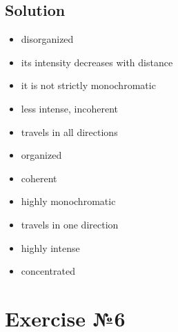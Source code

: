 \subsection*{Solution}
\begin{itemize}
      \item disorganized
      \item its intensity decreases with distance
      \item it is not strictly monochromatic
      \item less intense, incoherent
      \item travels in all directions
\end{itemize}

\begin{itemize}
      \item organized
      \item coherent
      \item highly monochromatic
      \item travels in one direction
      \item highly intense
      \item concentrated
\end{itemize}

\section*{Exercise №6}
\allocation{[Устно]}

